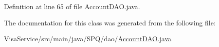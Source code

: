 Definition at line 65 of file Account\+D\+A\+O.\+java.



The documentation for this class was generated from the following file\+:\begin{DoxyCompactItemize}
\item 
Visa\+Service/src/main/java/\+S\+P\+Q/dao/\mbox{\hyperlink{_account_d_a_o_8java}{Account\+D\+A\+O.\+java}}\end{DoxyCompactItemize}
